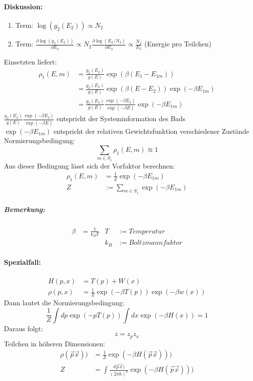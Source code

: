 \paragraph*{Diskussion:}
\begin{enumerate}
    \item Term: $\log(g_2(E_2))\propto N_2$
    \item Term: $\frac{\partial \log(g_2(E_2))}{\partial E_2}\propto N_2\frac{\partial \log(E_2/N_2)}{\partial E_2}\propto \frac{N_2}{E_2}$ (Energie pro Teilchen)
\end{enumerate}
Einsetzten liefert:
\begin{align*}
    \rho_1(E, m)&=\frac{g_2(E_2)}{g(E)}\exp(\beta(E_1-E_{1m}))\\
            &=\frac{g_2(E_2)}{g(E)}\exp(\beta(E-E_2))\exp(-\beta E_{1m})\\
            &=\frac{g_2(E_2)}{g(E)}\frac{\exp(-\beta E_2)}{\exp(-\beta E)}\exp(-\beta E_{1m})
\end{align*}
$\frac{g_2(E_2)}{g(E)}\frac{\exp(-\beta E_2)}{\exp(-\beta E)}$ entspricht der Systeminformation des Bads\\
$\exp(-\beta E_{1m})$ entspricht der relativen Gewichtsfunktion verschiedener Zustände\\
Normierungsbedingung:$$\sum_{m\in S_1}\rho_1(E, m) \approxeq 1$$
Aus dieser Bedingung lässt sich der Vorfaktor berechnen:
\begin{align*}
    \rho_1(E, m)&=\frac 1Z\exp(-\beta E_{1m})\\
    Z&:=\sum_{m\in S_1}\exp(-\beta E_{1m})
\end{align*}
\subparagraph*{Bemerkung:}
\begin{align*}
    \beta &= \frac 1{k_BT} & T &:= Temperatur\\
          &     & k_B &:= Boltzmannfaktor
\end{align*}
\paragraph*{Spezialfall:}
\begin{align*}
    H(p, x)&= T(p) + W(x)\\
    \rho(p, x)&=\frac 1Z\exp(-\beta T(p))\exp(-\beta w(x))
\end{align*}
Dann lautet die Normierungsbedingung:
$$\frac1Z\int dp\exp(-pT(p))\int dx\exp(-\beta H(x))=1$$
Daraus folgt: $$z=z_pz_x$$
Teilchen in höheren Dimensionen:
\begin{align*}
    \rho(\vec p\vec x))&=\frac1Z\exp(-\beta H(\vec p\vec x)))\\
    Z&=\int \frac{d\vec p\vec x)}{(2\pi\hbar)^d}\exp(-\beta H(\vec p\vec x)))
\end{align*}
